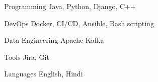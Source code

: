 

\begin{cvskills}

  \cvskill
    {Programming} %
    {Java, Python, Django, C++} %

  \cvskill
    {DevOps} %
    {Docker, CI/CD, Ansible, Bash scripting} %

  \cvskill
    {Data Engineering} %
    {Apache Kafka} %


  \cvskill
    {Tools} %
    {Jira, Git} %

  \cvskill
    {Languages} %
    {English, Hindi} %

\end{cvskills}